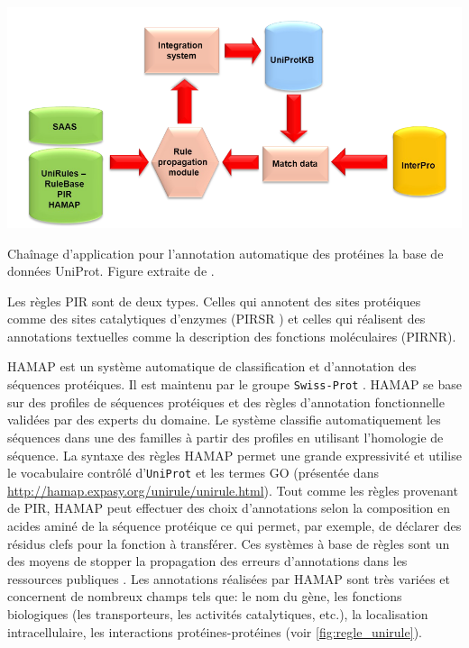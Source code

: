 \begin{refsegment}
    \begin{shadedfigure}[H]
        \centering
        \includegraphics[width=\textwidth]{img/unirule.png}
        \caption{ Chaînage d'application pour l'annotation automatique des protéines la base de données UniProt. Figure extraite de . }
        \label{fig:unirule}
    \end{shadedfigure}

    Les règles \gls{PIR} sont de deux types. Celles qui annotent des sites protéiques comme des sites catalytiques d’enzymes (\gls{PIRSR} \cite{vasudevan2011structure}) et celles qui réalisent des annotations textuelles comme la description des fonctions moléculaires (\gls{PIRNR}).
    
    \gls{HAMAP} est un système automatique de classification et d'annotation des séquences protéiques. Il est maintenu par le groupe \texttt{Swiss-Prot} . \gls{HAMAP} se base sur des profiles de séquences protéiques et des règles d'annotation fonctionnelle validées par des experts du domaine. Le système classifie automatiquement les séquences dans une des familles à partir des profiles en utilisant l’homologie de séquence. La syntaxe des règles  \gls{HAMAP} permet une grande expressivité et utilise le vocabulaire contrôlé d'\texttt{UniProt} et les termes \gls{GO} (présentée dans \url{http://hamap.expasy.org/unirule/unirule.html}). Tout comme les règles provenant de \gls{PIR}, \gls{HAMAP} peut effectuer des choix d'annotations selon la composition en acides aminé de la séquence protéique ce qui permet, par exemple, de déclarer des résidus clefs pour la fonction à transférer. Ces systèmes à base de règles sont un des moyens de stopper la propagation des erreurs d'annotations dans les ressources publiques \cite{schnoes2009annotation,devos2001intrinsic,bell2013can,gilks2002modeling}. Les annotations réalisées par \gls{HAMAP} sont très variées et concernent de nombreux champs tels que: le nom du gène, les fonctions biologiques (les transporteurs, les activités catalytiques, etc.), la localisation intracellulaire, les interactions protéines-protéines (voir \cref{fig:regle_unirule}).
    

\end{refsegment}
